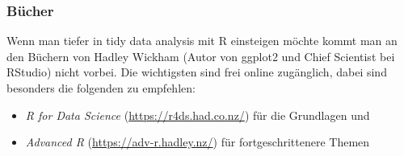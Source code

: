 \documentclass[
]{book}
\begin{document}
\hypertarget{buxfccher}{%
\subsubsection{Bücher}\label{buxfccher}}

Wenn man tiefer in tidy data analysis mit R einsteigen möchte kommt man an den Büchern von Hadley Wickham (Autor von ggplot2 und Chief Scientist bei RStudio) nicht vorbei. Die wichtigsten sind frei online zugänglich, dabei sind besonders die folgenden zu empfehlen:

\begin{itemize}
\item
  \emph{R for Data Science} \citep{grolemundDataScience}(\url{https://r4ds.had.co.nz/}) für die Grundlagen und
\item
  \emph{Advanced R} \citep{wickhamAdvanced2019}(\url{https://adv-r.hadley.nz/}) für fortgeschrittenere Themen
\end{itemize}

  
\end{document}
